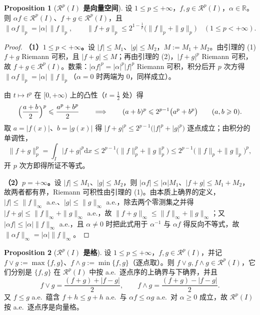 \documentclass[oneside]{book}
\theoremstyle{definition}
\newcommand{\R}{\mathbb{R}}
\newcommand{\Rc}{\mathcal{R}}
\newcommand{\dd}{\mathrm{d}}
\theoremstyle{definition}
\newtheorem{proposition}{Proposition}[section]
\begin{document}
	\begin{proposition}[\bfseries{$\Rc^p(I)$ 是向量空间}]
		设 $1\leqslant p\leqslant+\infty$，$f,g\in\Rc^p(I)$，$\alpha\in\R$。则 $\alpha f\in\Rc^p(I)$、$f+g\in\Rc^p(I)$，且
		\[
		\|\alpha f\|_p=|\alpha|\,\|f\|_p,
		\qquad
		\|f+g\|_p\leqslant2^{1-\frac1p}\bigl(\|f\|_p+\|g\|_p\bigr)\quad(1\leqslant p<+\infty).
		\]
	\end{proposition}
	
	\begin{proof}
		\textbf{（1）$1\leqslant p<+\infty$。}设 $|f|\leqslant M_1$、$|g|\leqslant M_2$，$M:=M_1+M_2$。由引理的 (1) $f+g$ Riemann 可积，且 $|f+g|\leqslant M$；再由引理的 (2)，$|f+g|^p$ Riemann 可积，故 $f+g\in\Rc^p(I)$。数乘：$|\alpha f|^p=|\alpha|^p|f|^p$ Riemann 可积，积分后开 $p$ 次方得 $\|\alpha f\|_p=|\alpha|\,\|f\|_p$（$\alpha=0$ 时两端为 $0$，同样成立）。
		
		由 $t\mapsto t^p$ 在 $[0,+\infty)$ 上的凸性（$t=\frac12$ 处）得
		\[
		\Bigl(\frac{a+b}2\Bigr)^p\leqslant\frac{a^p+b^p}2
		\qquad\Longrightarrow\qquad
		(a+b)^p\leqslant2^{p-1}\bigl(a^p+b^p\bigr)\qquad(a,b\geqslant0).
		\]
		取 $a=|f(x)|$、$b=|g(x)|$ 得 $|f+g|^p\leqslant2^{p-1}\bigl(|f|^p+|g|^p\bigr)$ 逐点成立；由积分的单调性，
		\[
		\|f+g\|_p^p=\int_I|f+g|^p\dd x\leqslant2^{p-1}\bigl(\|f\|_p^p+\|g\|_p^p\bigr)\leqslant2^{p-1}\bigl(\|f\|_p+\|g\|_p\bigr)^p,
		\]
		开 $p$ 次方即得所证不等式。
		
		\textbf{（2）$p=+\infty$。}设 $|f|\leqslant M_1$、$|g|\leqslant M_2$，则 $|\alpha f|\leqslant|\alpha|M_1$、$|f+g|\leqslant M_1+M_2$，故两者都有界，Riemann 可积性由引理的 (1)。由本质上确界的定义，$|f|\leqslant\|f\|_\infty$ a.e.、$|g|\leqslant\|g\|_\infty$ a.e.，除去两个零测集之并得
		$|f+g|\leqslant\|f\|_\infty+\|g\|_\infty$ a.e.，故 $\|f+g\|_\infty\leqslant\|f\|_\infty+\|g\|_\infty$；又 $|\alpha f|\leqslant|\alpha|\|f\|_\infty$ a.e.，且 $\alpha\ne0$ 时把此式用于 $\alpha^{-1}$ 与 $\alpha f$ 得反向不等式，故 $\|\alpha f\|_\infty=|\alpha|\|f\|_\infty$。
	\end{proof}
	
	\begin{proposition}[\bfseries{$\Rc^p(I)$ 是格}]
		设 $1\leqslant p\leqslant+\infty$，$f,g\in\Rc^p(I)$，并记 $f\vee g:=\max\{f,g\}$、$f\wedge g:=\min\{f,g\}$（逐点取）。则 $f\vee g,f\wedge g\in\Rc^p(I)$，它们分别是 $\{f,g\}$ 在 $\Rc^p(I)$ 中按 a.e.\ 逐点序的上确界与下确界，并且
		\[
		f\vee g=\frac{(f+g)+|f-g|}2,
		\qquad
		f\wedge g=\frac{(f+g)-|f-g|}2 .
		\]
		又 $f\leqslant g$ a.e.\ 蕴含 $f+h\leqslant g+h$ a.e.\ 与 $\alpha f\leqslant\alpha g$ a.e.\ 对 $\alpha\geqslant0$ 成立，故 $\Rc^p(I)$ 按 a.e.\ 逐点序是向量格。
	\end{proposition}
	
\end{document}
